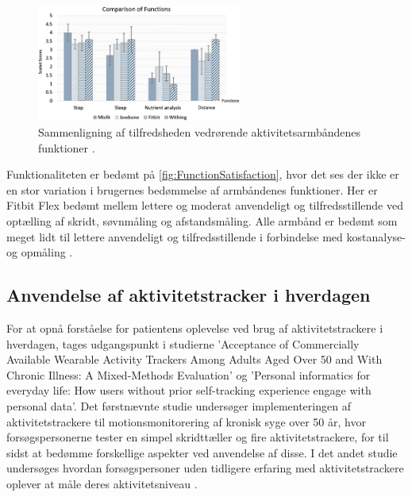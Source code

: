 \begin{figure}[H]
	\centering
	\includegraphics[width=0.6\textwidth]{figures/FunctionSatisfaction}
	\caption{Sammenligning af tilfredsheden vedrørende aktivitetsarmbåndenes funktioner \citep{kaewkannate2016}.}
	\label{fig:FunctionSatisfaction}
\end{figure}

Funktionaliteten er bedømt på \autoref{fig:FunctionSatisfaction}, hvor det ses der ikke er en stor variation i brugernes bedømmelse af armbåndenes funktioner. Her er Fitbit Flex bedømt mellem lettere og moderat anvendeligt og tilfredsstillende ved optælling af skridt, søvnmåling og afstandsmåling. Alle armbånd er bedømt som meget lidt til lettere anvendeligt og tilfredsstillende i forbindelse med kostanalyse- og opmåling \citep{kaewkannate2016}.

\subsection{Anvendelse af aktivitetstracker i hverdagen}

For at opnå forståelse for patientens oplevelse ved brug af aktivitetstrackere i hverdagen, tages udgangspunkt i studierne 'Acceptance of Commercially Available Wearable Activity Trackers Among Adults Aged Over 50 and With Chronic Illness: A Mixed-Methods Evaluation' og 'Personal informatics for everyday life: How users without prior self-tracking experience engage with personal data'. Det førstnævnte studie undersøger implementeringen af aktivitetstrackere til motionsmonitorering af kronisk syge over 50 år, hvor forsøgspersonerne tester en simpel skridttæller og fire aktivitetstrackere, for til sidst at bedømme forskellige aspekter ved anvendelse af disse. I det andet studie undersøges hvordan forsøgspersoner uden tidligere erfaring med aktivitetstrackere oplever at måle deres aktivitetsniveau \citep{mercer2016, rapp2016}.

